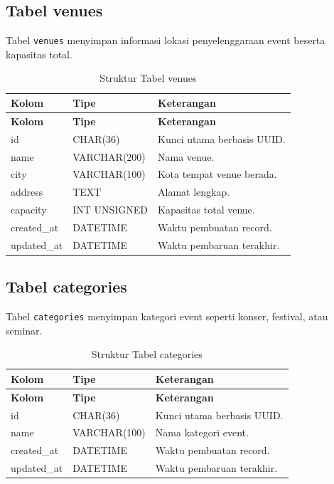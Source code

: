 \documentclass[12pt,a4paper]{report}
\begin{document}
\subsection{Tabel venues}
Tabel \texttt{venues} menyimpan informasi lokasi penyelenggaraan event beserta kapasitas total.

\begin{longtable}{p{3.6cm} p{3.6cm} p{8.5cm}}
\caption{Struktur Tabel venues} \label{tab:venues} \\
\toprule
\textbf{Kolom} & \textbf{Tipe} & \textbf{Keterangan} \\
\midrule
\endfirsthead
\toprule
\textbf{Kolom} & \textbf{Tipe} & \textbf{Keterangan} \\
\midrule
\endhead
\bottomrule
\endfoot
id          & CHAR(36)      & Kunci utama berbasis UUID. \\
name        & VARCHAR(200)  & Nama venue. \\
city        & VARCHAR(100)  & Kota tempat venue berada. \\
address     & TEXT          & Alamat lengkap. \\
capacity    & INT UNSIGNED  & Kapasitas total venue. \\
created\_at & DATETIME      & Waktu pembuatan record. \\
updated\_at & DATETIME      & Waktu pembaruan terakhir. \\
\end{longtable}

\subsection{Tabel categories}
Tabel \texttt{categories} menyimpan kategori event seperti konser, festival, atau seminar.

\begin{longtable}{p{3.6cm} p{3.6cm} p{8.5cm}}
\caption{Struktur Tabel categories} \label{tab:categories} \\
\toprule
\textbf{Kolom} & \textbf{Tipe} & \textbf{Keterangan} \\
\midrule
\endfirsthead
\toprule
\textbf{Kolom} & \textbf{Tipe} & \textbf{Keterangan} \\
\midrule
\endhead
\bottomrule
\endfoot
id          & CHAR(36)     & Kunci utama berbasis UUID. \\
name        & VARCHAR(100) & Nama kategori event. \\
created\_at & DATETIME     & Waktu pembuatan record. \\
updated\_at & DATETIME     & Waktu pembaruan terakhir. \\
\end{longtable}
\end{document}
